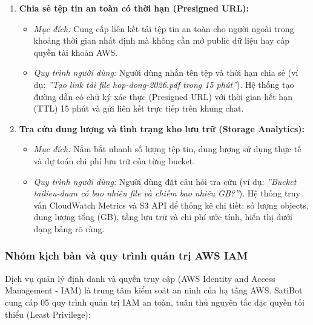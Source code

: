 \documentclass[a4paper,12pt]{article}
\begin{document}
\begin{enumerate}
  \item \textbf{Chia sẻ tệp tin an toàn có thời hạn (Presigned URL):}
  \begin{itemize}
    \item \textit{Mục đích:} Cung cấp liên kết tải tệp tin an toàn cho người ngoài trong khoảng thời gian nhất định mà không cần mở public dữ liệu hay cấp quyền tài khoản AWS.
    \item \textit{Quy trình người dùng:} Người dùng nhắn tên tệp và thời hạn chia sẻ (ví dụ: \textit{''Tạo link tải file hop-dong-2026.pdf trong 15 phút''}). Hệ thống tạo đường dẫn có chữ ký xác thực (Presigned URL) với thời gian hết hạn (TTL) 15 phút và gửi liên kết trực tiếp trên khung chat.
  \end{itemize}

  \item \textbf{Tra cứu dung lượng và tình trạng kho lưu trữ (Storage Analytics):}
  \begin{itemize}
    \item \textit{Mục đích:} Nắm bắt nhanh số lượng tệp tin, dung lượng sử dụng thực tế và dự toán chi phí lưu trữ của từng bucket.
    \item \textit{Quy trình người dùng:} Người dùng đặt câu hỏi tra cứu (ví dụ: \textit{''Bucket tailieu-duan có bao nhiêu file và chiếm bao nhiêu GB?''}). Hệ thống truy vấn CloudWatch Metrics và S3 API để thống kê chi tiết: số lượng objects, dung lượng tổng (GB), tầng lưu trữ và chi phí ước tính, hiển thị dưới dạng bảng rõ ràng.
  \end{itemize}
\end{enumerate}

\subsubsection{Nhóm kịch bản và quy trình quản trị AWS IAM}

Dịch vụ quản lý định danh và quyền truy cập (AWS Identity and Access Management - IAM) là trung tâm kiểm soát an ninh của hạ tầng AWS. SatiBot cung cấp 05 quy trình quản trị IAM an toàn, tuân thủ nguyên tắc đặc quyền tối thiểu (Least Privilege):
\end{document}
